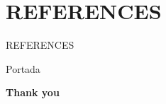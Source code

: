 \nocite{*} %
\section*{REFERENCES}
\begin{frame}[allowframebreaks]{REFERENCES} %
\begingroup %
\renewcommand{\color}[1]{} %
\small{} %

\endgroup %
\end{frame}
\begin{frame} %
	\begin{beamercolorbox}[ht=\paperheight,wd=\paperwidth, center]{Portada}
		\begin{center}\Huge\textbf{Thank you}\end{center} %
		
		\vspace{0.44\paperheight}
    \end{beamercolorbox}
\end{frame}

